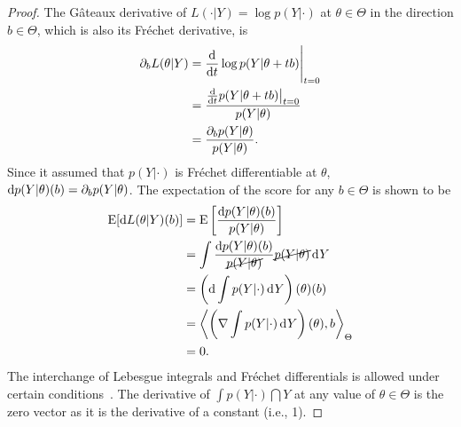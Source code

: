 \begin{proof}
  


The Gâteaux derivative of $L(\cdot|Y) = \log p(Y|\cdot)$ at $\theta\in\Theta$ in the direction $b\in\Theta$, which is also its Fréchet derivative, is
\begin{align*}
  \partial_b L(\theta|Y) 
  &= \frac{\text{d}}{\text{d} t} \log p(Y|\theta + tb) \Bigg|_{t=0} \\
  &= \frac{\frac{\text{d}}{\text{d} t}p(Y|\theta + tb)\big|_{t=0}}{p(Y|\theta)} \\
  &= \frac{\partial_b p(Y|\theta)}{p(Y|\theta)}.
\end{align*}
Since it assumed that $p(Y|\cdot)$ is Fréchet differentiable at $\theta$, $\text{d} p(Y|\theta)(b) = \partial_b p(Y|\theta)$.
The expectation of the score for any $b\in\Theta$ is shown to be
\begin{align*}
  \operatorname{E}[\text{d} L(\theta|Y)(b)] 
  &= \operatorname{E} \left[ \frac{\text{d} p(Y|\theta)(b)}{p(Y|\theta)} \right] \\
  &= \int \frac{\text{d} p(Y|\theta)(b)}{\cancel{p(Y|\theta)}} \cancel{p(Y|\theta)} \operatorname{d}\hspace{0.5pt}\! Y \\
  &= \left(\text{d}\int p(Y|\cdot) \operatorname{d}\hspace{0.5pt}\! Y \right)(\theta)(b) \\
  &= \left\langle \left(\nabla \int p(Y|\cdot) \operatorname{d}\hspace{0.5pt}\! Y\right)(\theta)  , b \right\rangle_\Theta \\
  &=0.
\end{align*}
The interchange of Lebesgue integrals and Fréchet differentials is allowed under certain conditions\footnotemark~\citep{kammar2016}.
The derivative of $\int p(Y|\cdot)\dint Y$ at any value of $\theta\in\Theta$ is the zero vector as it is the derivative of a constant (i.e., 1).


\end{proof}
